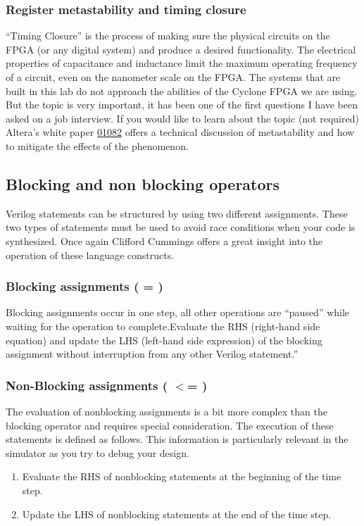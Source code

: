     \subsubsection{Register metastability and timing closure}
      ``Timing Closure'' is the process of making sure the physical circuits on the FPGA (or any digital system) and produce a desired functionality. The electrical properties of capacitance and inductance limit the maximum operating frequency of a circuit, even on the nanometer scale on the FPGA. The systems that are built in this lab do not approach the abilities of the Cyclone FPGA we are using. But the topic is very important, it has been one of the first questions I have been asked on a job interview. If you would like to learn about the topic (not required) Altera's white paper \href{http://www.altera.com/literature/wp/wp-01082-quartus-ii-metastability.pdf}{01082} offers a technical discussion of metastability and how to mitigate the effects of the phenomenon.

  \subsection{Blocking and non blocking operators}
    Verilog statements can be structured by using two different assignments. These two types of statements must be used to avoid race conditions when your code is synthesized. Once again Clifford Cummings offers a great insight into the operation of these language constructs. 
      
    \subsubsection{Blocking assignments \bfseries ( = )} 
      Blocking assignments occur in one step, all other operations are ``paused'' while waiting for the operation to complete.Evaluate the RHS (right-hand side equation) and update the LHS (left-hand side expression) of the blocking assignment without interruption from any other Verilog statement.''\cite{Sunburst:BlockNoBlock}

    \subsubsection{Non-Blocking assignments \bfseries ( $<$= )} 
      The evaluation of nonblocking assignments is a bit more complex than the blocking operator and requires special consideration. The execution of these statements is defined as follows. This information is particularly relevant in the simulator as you try to debug your design. \cite{Sunburst:BlockNoBlock} 
      \begin{enumerate}
        \item Evaluate the RHS of nonblocking statements at the beginning of the time step.
        \item Update the LHS of nonblocking statements at the end of the time step.
      \end{enumerate}

